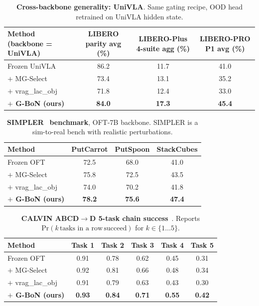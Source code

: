 \begin{table}[h]
\centering
\caption{\textbf{Cross-backbone generality: UniVLA}.
Same gating recipe, OOD head retrained on UniVLA hidden state.}
\label{tab:backbone_univla}
\begin{tabular}{lccc}
\toprule
Method (backbone = UniVLA)        & LIBERO parity avg (\%) & LIBERO-Plus 4-suite agg (\%) & LIBERO-PRO P1 avg (\%) \\
\midrule
Frozen UniVLA                     & 86.2 & 11.7 & 41.0 \\
$+$ MG-Select \citep{mgselect2026}     & 73.4 & 13.1 & 35.2 \\
$+$ vrag\_lac\_obj                & 71.8 & 12.4 & 33.0 \\
\textbf{$+$ G-BoN (ours)}         & \textbf{84.0} & \textbf{17.3} & \textbf{45.4} \\
\bottomrule
\end{tabular}
\end{table}

\begin{table}[h]
\centering
\caption{\textbf{SIMPLER}~\citep{simpler2024} \textbf{benchmark}, OFT-7B
backbone. SIMPLER is a sim-to-real bench with realistic perturbations.}
\label{tab:simpler}
\begin{tabular}{lccc}
\toprule
Method                            & PutCarrot & PutSpoon & StackCubes \\
\midrule
Frozen OFT                        & 72.5 & 68.0 & 41.0 \\
$+$ MG-Select \citep{mgselect2026}     & 75.8 & 72.5 & 43.5 \\
$+$ vrag\_lac\_obj                & 74.0 & 70.2 & 41.8 \\
\textbf{$+$ G-BoN (ours)}         & \textbf{78.2} & \textbf{75.6} & \textbf{47.4} \\
\bottomrule
\end{tabular}
\end{table}

\begin{table}[h]
\centering
\caption{\textbf{CALVIN ABCD$\to$D 5-task chain
success}~\citep{calvin2022}. Reports $\mathrm{Pr}(k\,\text{tasks
in a row}\,\text{succeed})$ for $k\in\{1\dots 5\}$.}
\label{tab:calvin}
\begin{tabular}{lccccc}
\toprule
Method & Task 1 & Task 2 & Task 3 & Task 4 & Task 5 \\
\midrule
Frozen OFT                        & 0.91 & 0.78 & 0.62 & 0.45 & 0.31 \\
$+$ MG-Select \citep{mgselect2026}     & 0.92 & 0.81 & 0.66 & 0.48 & 0.34 \\
$+$ vrag\_lac\_obj                & 0.91 & 0.79 & 0.63 & 0.43 & 0.30 \\
\textbf{$+$ G-BoN (ours)}         & \textbf{0.93} & \textbf{0.84} & \textbf{0.71} & \textbf{0.55} & \textbf{0.42} \\
\bottomrule
\end{tabular}
\end{table}

